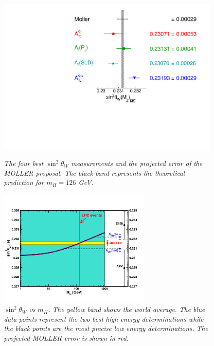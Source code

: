 \begin{figure}[ht]
\begin{minipage}[b]{0.48\linewidth}
\centering
\includegraphics[width=0.95\linewidth]{ChargedLeptons/Figures/sin2thW_wmoll.pdf}
  \caption{{\it The four best $\sin^2\theta_W$ measurements and the projected error of the MOLLER proposal.
  The black band represents the theoretical prediction for $m_H = 126$ GeV.}}
\label{fig:cl:s2tw}
\end{minipage}
\hspace{0.3cm}
\begin{minipage}[b]{0.48\linewidth}
\centering
    \includegraphics[width=3in]{ChargedLeptons/Figures/st2wvsmh.pdf}
  \caption{{\it $\sin^2\theta_W$ vs $m_H$. The yellow band shows the world average. The blue data points
  represent the two best high energy determinations while the black points are the most precise low energy
  determinations. The projected MOLLER error is shown in red. }}
  \label{fig:cl:s2twvsmh}
\end{minipage}
\end{figure}

